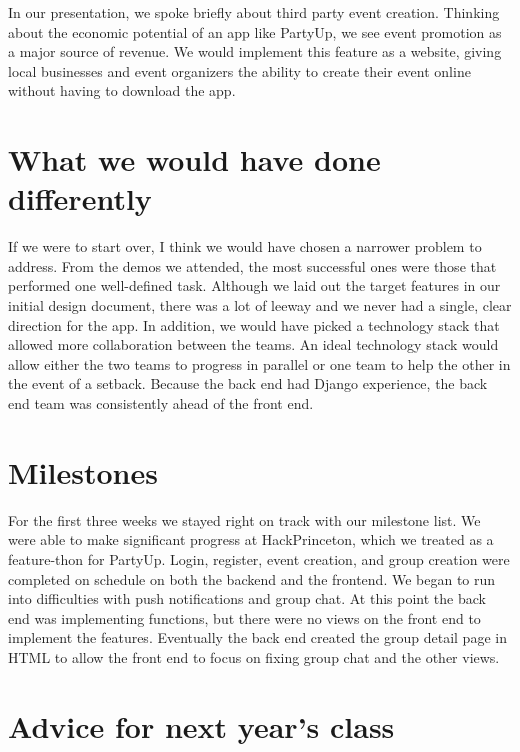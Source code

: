 \documentclass[12pt]{article}
\begin{document}
\bigskip

In our presentation, we spoke briefly about third party event creation. 
Thinking about the economic potential of an app like PartyUp, we see event promotion as a major source of revenue. 
We would implement this feature as a website, giving local businesses and event organizers the ability to create their event online without having to download the app.

\bigskip

\section{What we would have done differently}

If we were to start over, I think we would have chosen a narrower problem to address. 
From the demos we attended, the most successful ones were those that performed one well-defined task. 
Although we laid out the target features in our initial design document, there was a lot of leeway and we never had a single, clear direction for the app.
In addition, we would have picked a technology stack that allowed more collaboration between the teams.
An ideal technology stack would allow either the two teams to progress in parallel or one team to help the other in the event of a setback. 
Because the back end had Django experience, the back end team was consistently ahead of the front end.

\section{Milestones}

For the first three weeks we stayed right on track with our milestone list. 
We were able to make significant progress at HackPrinceton, which we treated as a feature-thon for PartyUp. 
Login, register, event creation, and group creation were completed on schedule on both the backend and the frontend. 
We began to run into difficulties with push notifications and group chat. 
At this point the back end was implementing functions, but there were no views on the front end to implement the features. 
Eventually the back end created the group detail page in HTML to allow the front end to focus on fixing group chat and the other views. 

\bigskip

\section{Advice for next year's class}
\end{document}
